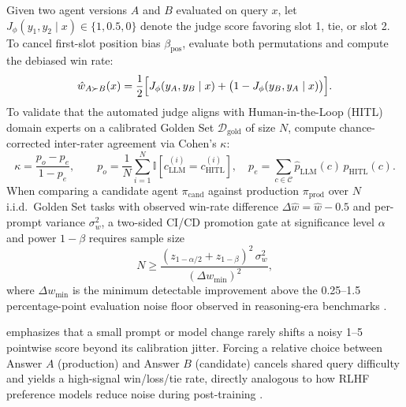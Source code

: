 \documentclass[../../../../master.tex]{subfiles}
\begin{document}
\begin{coremath}
Given two agent versions $A$ and $B$ evaluated on query $x$, let $J_\phi(y_1, y_2 \mid x) \in \{1, 0.5, 0\}$ denote the judge score favoring slot 1, tie, or slot 2. To cancel first-slot position bias $\beta_{\mathrm{pos}}$, evaluate both permutations and compute the debiased win rate:
\begin{equation}
  \hat{w}_{A \succ B}(x) = \frac{1}{2}\Bigl[J_\phi(y_A, y_B \mid x) + \bigl(1 - J_\phi(y_B, y_A \mid x)\bigr)\Bigr].
  \label{eq:ops:debiased_win}
\end{equation}
To validate that the automated judge aligns with Human-in-the-Loop (HITL) domain experts on a calibrated Golden Set $\mathcal{D}_{\mathrm{gold}}$ of size $N$, compute chance-corrected inter-rater agreement via Cohen's $\kappa$:
\begin{equation}
  \kappa = \frac{p_o - p_e}{1 - p_e}, \qquad p_o = \frac{1}{N}\sum_{i=1}^{N}\mathbb{I}[c_{\mathrm{LLM}}^{(i)} = c_{\mathrm{HITL}}^{(i)}], \quad p_e = \sum_{c \in \mathcal{C}} \hat{p}_{\mathrm{LLM}}(c)\,\hat{p}_{\mathrm{HITL}}(c).
  \label{eq:ops:cohen_kappa}
\end{equation}
When comparing a candidate agent $\pi_{\mathrm{cand}}$ against production $\pi_{\mathrm{prod}}$ over $N$ i.i.d.\ Golden Set tasks with observed win-rate difference $\Delta \hat{w} = \hat{w} - 0.5$ and per-prompt variance $\sigma_w^2$, a two-sided CI/CD promotion gate at significance level $\alpha$ and power $1-\beta$ requires sample size
\begin{equation}
  N \ge \frac{(z_{1-\alpha/2} + z_{1-\beta})^2\,\sigma_w^2}{(\Delta w_{\min})^2},
  \label{eq:ops:sample_power}
\end{equation}
where $\Delta w_{\min}$ is the minimum detectable improvement above the 0.25--1.5 percentage-point evaluation noise floor observed in reasoning-era benchmarks .
\end{coremath}

\begin{intuition}
 emphasizes that a small prompt or model change rarely shifts a noisy 1--5 pointwise score beyond its calibration jitter. Forcing a relative choice between Answer $A$ (production) and Answer $B$ (candidate) cancels shared query difficulty and yields a high-signal win/loss/tie rate, directly analogous to how RLHF preference models reduce noise during post-training .
\end{intuition}
\end{document}
